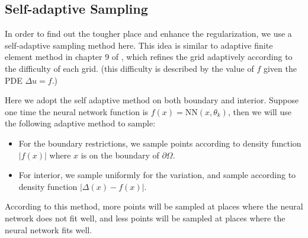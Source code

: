 \documentclass{article}
\begin{document}
\subsection{Self-adaptive Sampling}
\par In order to find out the tougher place and enhance the regularization, we use a self-adaptive sampling method here. This idea is similar to adaptive finite element method in chapter 9 of \cite{brenner2007mathematical}, which refines the grid adaptively according to the difficulty of each grid. (this difficulty is described by the value of $f$ given the PDE $\Delta u = f$.) 
\par Here we adopt the self adaptive method on both boundary and interior. Suppose one time the neural network function is $f(x) = \mathrm{NN}(x, \theta_k)$, then we will use the following adaptive method to sample:
\begin{itemize}
	\item For the boundary restrictions, we sample points according to density function $|f(x)|$ where $x$ is on the boundary of $\partial\Omega$.
	\item For interior, we sample uniformly for the variation, and sample according to density function $|\Delta(x) - f(x)|$.
\end{itemize}
\par  According to this method, more points will be sampled at places where the neural network does not fit well, and less points will be sampled at places where the neural network fits well. 
\end{document}

